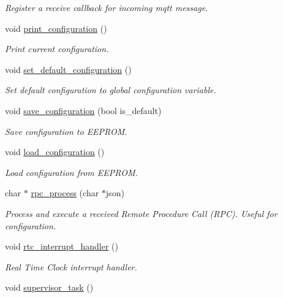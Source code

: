\begin{DoxyCompactItemize}
\begin{DoxyCompactList}\small\item\em Register a receive callback for incoming mqtt message. \end{DoxyCompactList}\item 
void \hyperlink{rmap_8ino_a65b2dadc0411e43874ec8ed7f73bc62a}{print\+\_\+configuration} ()
\begin{DoxyCompactList}\small\item\em Print current configuration. \end{DoxyCompactList}\item 
void \hyperlink{rmap_8ino_a951e4934b8add405b8fe45417fc380f5}{set\+\_\+default\+\_\+configuration} ()
\begin{DoxyCompactList}\small\item\em Set default configuration to global configuration variable. \end{DoxyCompactList}\item 
void \hyperlink{rmap_8ino_afa979a8cb238fe81bf20654dfd6096ef}{save\+\_\+configuration} (bool is\+\_\+default)
\begin{DoxyCompactList}\small\item\em Save configuration to E\+E\+P\+R\+OM. \end{DoxyCompactList}\item 
void \hyperlink{rmap_8ino_a32a64a2800c724fb28e10636f2ec20b9}{load\+\_\+configuration} ()
\begin{DoxyCompactList}\small\item\em Load configuration from E\+E\+P\+R\+OM. \end{DoxyCompactList}\item 
char $\ast$ \hyperlink{rmap_8ino_a99f56f4c38f64be47b52818cbf57bb2d}{rpc\+\_\+process} (char $\ast$json)
\begin{DoxyCompactList}\small\item\em Process and execute a received Remote Procedure Call (R\+PC). Useful for configuration. \end{DoxyCompactList}\item 
void \hyperlink{rmap_8ino_a17374e428acd4fc86f2b8a8ede54deca}{rtc\+\_\+interrupt\+\_\+handler} ()
\begin{DoxyCompactList}\small\item\em Real Time Clock interrupt handler. \end{DoxyCompactList}\item 
void \hyperlink{rmap_8ino_a2f44f14407ed3f1ae93126c1533e697b}{supervisor\+\_\+task} ()

\end{DoxyCompactItemize}

